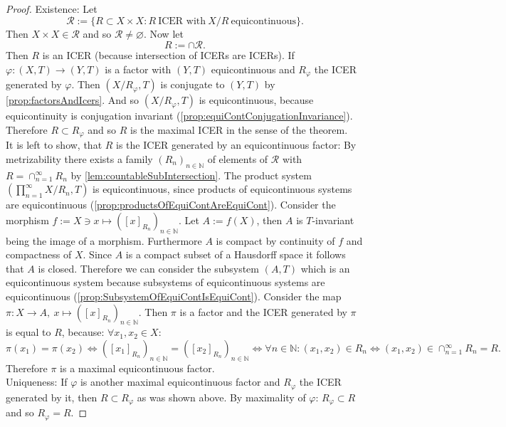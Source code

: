 \begin{proof}
  Existence:
  Let
  \begin{equation*}
    \mathcal{R} := \{ R \subset X \times X : R \ \text{ICER with} \ X/R \ \text{equicontinuous}\}.
  \end{equation*}
  Then $ X \times X \in \mathcal{R}$ and so $\mathcal{R} \neq \varnothing$.
    Now let 
  \begin{equation*}
    R:= \cap \mathcal{R}.
  \end{equation*}
  Then $R$ is an ICER (because intersection of ICERs are ICERs).
  If $\varphi : (X,T)\to (Y,T)$ is a factor with $(Y,T)$ equicontinuous and $R_\varphi$ the ICER generated by $\varphi$. Then $(X/R_\varphi,T)$ is conjugate to $(Y,T)$ by \cref{prop:factorsAndIcers}.
  And so $(X/R_\varphi,T)$ is equicontinuous, because equicontinuity is conjugation invariant (\cref{prop:equiContConjugationInvariance}).
  Therefore $R \subset R_\varphi$ and so $R$ is the maximal ICER in the sense of the theorem.\\
  It is left to show, that $R$ is the ICER generated by an equicontinuous factor:
  By metrizability there exists a family $(R_n)_{n\in\mathbb{N}}$ of elements of $\mathcal{R}$ with
  $R = \cap_{n=1}^\infty R_n$ by \cref{lem:countableSubIntersection}.
  The product system $(\prod_{n=1}^\infty X/R_n,T)$ is equicontinuous, since products of equicontinuous systems are equicontinuous (\cref{prop:productsOfEquiContAreEquiCont}).
  Consider the morphism $f:= X \ni x  \mapsto ([x]_{R_n})_{n \in \mathbb{N}}$.
  Let $A:= f(X)$, then $A$ is $T$-invariant being the image of a morphism.
  Furthermore $A$ is compact by continuity of $f$ and compactness of $X$.
  Since $A$ is a compact subset of a Hausdorff space it follows that $A$ is closed.
  Therefore we can consider the subsystem $(A,T)$ which is an equicontinuous system because subsystems of equicontinuous systems are equicontinuous (\cref{prop:SubsystemOfEquiContIsEquiCont}).
  Consider the map $\pi: X \to  A , \  x  \mapsto ([x]_{R_n})_{n \in \mathbb{N}}$.
  Then $\pi$ is a factor and the ICER generated by $\pi$ is equal to $R$, because: $\forall x_1,x_2 \in X$:
  \begin{equation*}
    \pi(x_1) = \pi (x_2) \Leftrightarrow ([x_1]_{R_n})_{n\in \mathbb{N}} = ([x_2]_{R_n})_{n\in \mathbb{N}}
    \Leftrightarrow \forall n \in \mathbb{N} : (x_1, x_2 ) \in R_n
    \Leftrightarrow (x_1,x_2) \in \cap_{n=1}^\infty R_n = R.
  \end{equation*}
  Therefore $\pi$ is a maximal equicontinuous factor.\\
  Uniqueness:
  If $\varphi$ is another maximal equicontinuous factor and $R_\varphi$ the ICER generated by it, then $R \subset R_\varphi$ as was shown above.
  By maximality of $\varphi$: $R_\varphi \subset R$ and so $R_\varphi = R$.
\end{proof}

